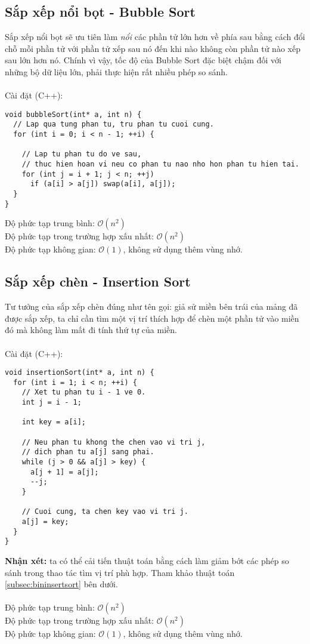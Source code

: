 \documentclass[]{article}
\begin{document}
\subsection{Sắp xếp nổi bọt - Bubble Sort}
Sắp xếp nổi bọt sẽ ưu tiên làm \textit{nổi} các phần tử lớn hơn về phía sau bằng cách đổi chỗ mỗi phần tử với phần tử xếp sau nó đến khi nào không còn phần tử nào xếp sau lớn hơn nó. Chính vì vậy, tốc độ của Bubble Sort đặc biệt chậm đối với những bộ dữ liệu lớn, phải thực hiện rất nhiều phép so sánh.
\\\\
Cài đặt (C++):
\begin{lstlisting}
void bubbleSort(int* a, int n) {
  // Lap qua tung phan tu, tru phan tu cuoi cung.
  for (int i = 0; i < n - 1; ++i) {

    // Lap tu phan tu do ve sau,
    // thuc hien hoan vi neu co phan tu nao nho hon phan tu hien tai.
    for (int j = i + 1; j < n; ++j)
      if (a[i] > a[j]) swap(a[i], a[j]);
  }
}
\end{lstlisting}
Độ phức tạp trung bình: $\mathcal{O}(n^2)$
\\
Độ phức tạp trong trường hợp xấu nhất: $\mathcal{O}(n^2)$
\\
Độ phức tạp không gian: $\mathcal{O}(1)$, không sử dụng thêm vùng nhớ.
\subsection{Sắp xếp chèn - Insertion Sort}
Tư tưởng của sắp xếp chèn đúng như tên gọi: giả sử miền bên trái của mảng đã được sắp xếp, ta chỉ cần tìm một vị trí thích hợp để chèn một phần tử vào miền đó mà không làm mất đi tính thứ tự của miền.
\\\\
Cài đặt (C++):
\begin{lstlisting}
void insertionSort(int* a, int n) {
  for (int i = 1; i < n; ++i) {
    // Xet tu phan tu i - 1 ve 0.
    int j = i - 1;

    int key = a[i];

    // Neu phan tu khong the chen vao vi tri j,
    // dich phan tu a[j] sang phai.
    while (j > 0 && a[j] > key) {
      a[j + 1] = a[j];
      --j;
    }

    // Cuoi cung, ta chen key vao vi tri j.
    a[j] = key;
  }
}
\end{lstlisting}
\textbf{Nhận xét:} ta có thể cải tiến thuật toán bằng cách làm giảm bớt các phép so sánh trong thao tác tìm vị trí phù hợp. Tham khảo thuật toán \ref{subsec:bininsertsort} bên dưới.
\\\\
Độ phức tạp trung bình: $\mathcal{O}(n^2)$
\\
Độ phức tạp trong trường hợp xấu nhất: $\mathcal{O}(n^2)$
\\
Độ phức tạp không gian: $\mathcal{O}(1)$, không sử dụng thêm vùng nhớ.
\end{document}

